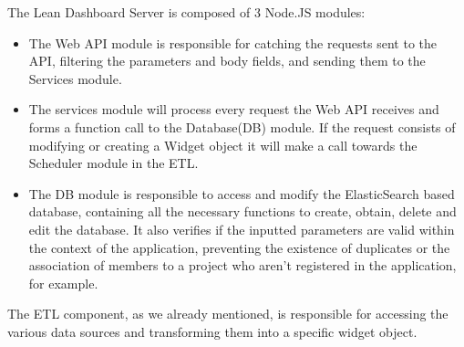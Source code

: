 \documentclass[a4paper,twoside,10pt]{report}
\begin{document}
The Lean Dashboard Server is composed of 3 Node.JS\cite{NODE} modules:
\begin{itemize}
  \item The Web API module is responsible for catching the requests sent to the API, filtering the parameters and body fields, and sending them to the Services module.
  \item The services module will process every request the Web API receives and forms a function call to the Database(DB) module. If the request consists of modifying or creating a Widget object it will make a call towards the Scheduler module in the ETL.
  \item The DB module is responsible to access and modify the ElasticSearch based database, containing all the necessary functions to create, obtain, delete and edit the database. It also verifies if the inputted parameters are valid within the context of the application, preventing the existence of duplicates or the association of members to a project who aren't registered in the application, for example.
\end{itemize}
\newpage
The ETL component, as we already mentioned, is responsible for accessing the various data sources and transforming them into a specific widget object.
\end{document}
